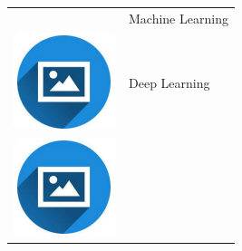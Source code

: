 \documentclass{article}
\begin{document}
\begin{paracol}{2}
\begin{tabular}{ll}
\begin{minipage}{0.1\linewidth}
         \end{minipage} & Machine Learning \\[10pt]
         \begin{minipage}{0.1\linewidth}
         \includegraphics[width=\linewidth]{picon.png}
         \end{minipage} & Deep Learning \\[10pt]
         \begin{minipage}{0.1\linewidth}
         \includegraphics[width=\linewidth]{picon.png}

\end{minipage}
\end{tabular}
\end{paracol}
\end{document}
